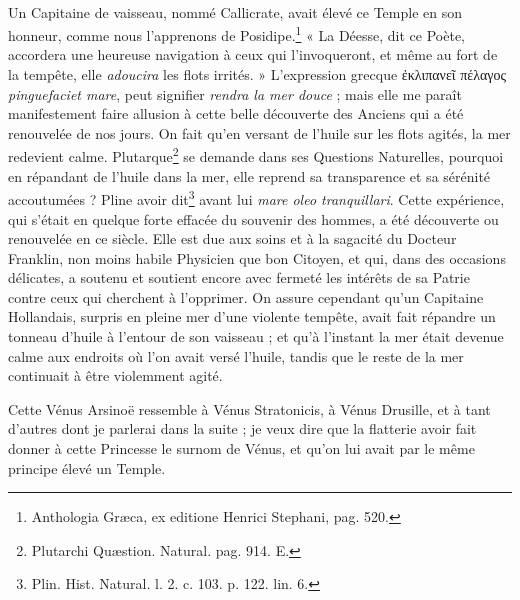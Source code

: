 \documentclass[a4paper, 11pt, oneside, polutonikogreek, french]{article}
\begin{document}
\paragraph{}
Un Capitaine de vaisseau, nommé Callicrate, avait élevé ce Temple en son honneur, comme nous l'apprenons de Posidipe.\footnote{Anthologia Græca, ex editione Henrici Stephani, pag. 520.} « La Déesse, dit ce Poète, accordera une heureuse navigation à ceux qui l'invoqueront, et même au fort de la tempête, elle \emph{adoucira} les flots irrités. » L'expression grecque ἐκλιπανεῖ πέλαγος \emph{pinguefaciet mare}, peut signifier \emph{rendra la mer douce} ; mais elle me paraît manifestement faire allusion à cette belle découverte des Anciens qui a été renouvelée de nos jours. On fait qu'en versant de l'huile sur les flots agités, la mer redevient calme. Plutarque\footnote{Plutarchi Quæstion. Natural. pag. 914. E.} se demande dans ses Questions Naturelles, pourquoi en répandant de l'huile dans la mer, elle reprend sa transparence et sa sérénité accoutumées ? Pline avoir dit\footnote{Plin. Hist. Natural. l. 2. c. 103. p. 122. lin. 6.} avant lui \emph{mare oleo tranquillari}. Cette expérience, qui s'était en quelque forte effacée du souvenir des hommes, a été découverte ou renouvelée en ce siècle. Elle est due aux soins et à la sagacité du Docteur Franklin, non moins habile Physicien que bon Citoyen, et qui, dans des occasions délicates, a soutenu et soutient encore avec fermeté les intérêts de sa Patrie contre ceux qui cherchent à l'opprimer. On assure cependant qu'un Capitaine Hollandais, surpris en pleine mer d'une violente tempête, avait fait répandre un tonneau d'huile à l'entour de son vaisseau ; et qu'à l'instant la mer était devenue calme aux endroits où l'on avait versé l'huile, tandis que le reste de la mer continuait à être violemment agité.

Cette Vénus Arsinoë ressemble à Vénus Stratonicis, à Vénus Drusille, et à tant d'autres dont je parlerai dans la suite ; je veux dire que la flatterie avoir fait donner à cette Princesse le surnom de Vénus, et qu'on lui avait par le même principe élevé un Temple.
\end{document}
